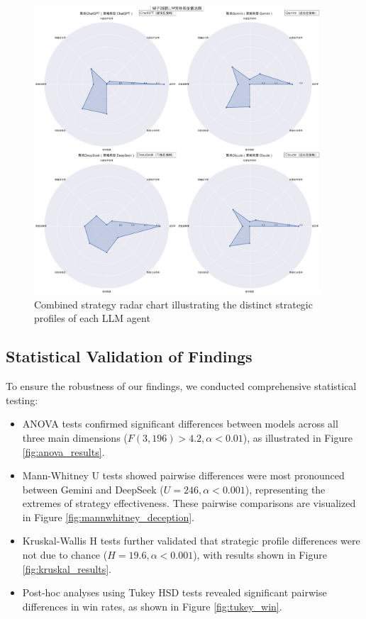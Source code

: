 \documentclass{article}
\begin{document}
\begin{figure}[H]
    \centering
    \includegraphics[width=0.95\textwidth]{figures/combined_strategy_radar.png}
    \caption{Combined strategy radar chart illustrating the distinct strategic profiles of each LLM agent}
    \label{fig:strategy_radar}
\end{figure}

\subsection{Statistical Validation of Findings}
To ensure the robustness of our findings, we conducted comprehensive statistical testing:

\begin{itemize}
    \item ANOVA tests confirmed significant differences between models across all three main dimensions ($F(3,196) > 4.2, \alpha < 0.01$), as illustrated in Figure \ref{fig:anova_results}.
    
    \item Mann-Whitney U tests showed pairwise differences were most pronounced between Gemini and DeepSeek ($U = 246, \alpha < 0.001$), representing the extremes of strategy effectiveness. These pairwise comparisons are visualized in Figure \ref{fig:mannwhitney_deception}.
    
    \item Kruskal-Wallis H tests further validated that strategic profile differences were not due to chance ($H = 19.6, \alpha < 0.001$), with results shown in Figure \ref{fig:kruskal_results}.
    
    \item Post-hoc analyses using Tukey HSD tests revealed significant pairwise differences in win rates, as shown in Figure \ref{fig:tukey_win}.
\end{itemize}
\end{document}

